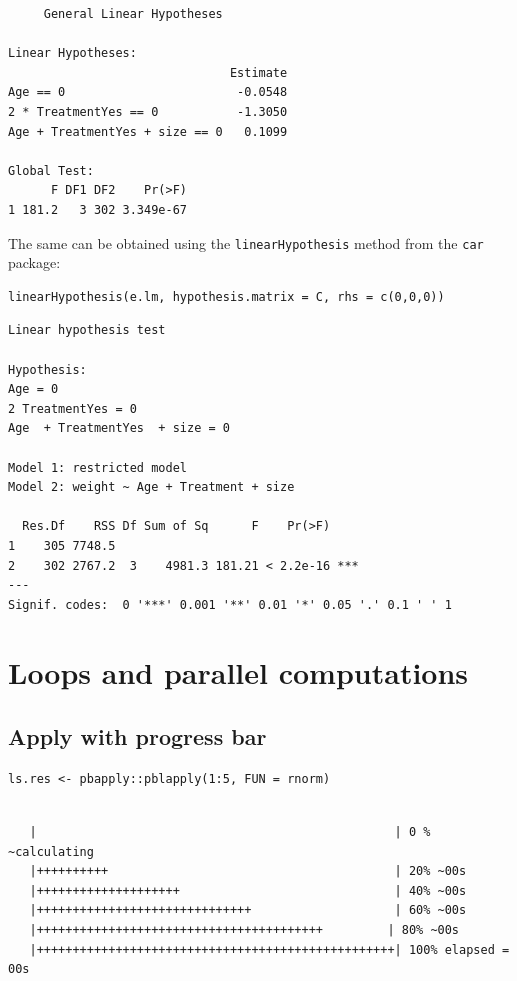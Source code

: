 \documentclass{article}
\begin{document}
\begin{verbatim}
	 General Linear Hypotheses

Linear Hypotheses:
                               Estimate
Age == 0                        -0.0548
2 * TreatmentYes == 0           -1.3050
Age + TreatmentYes + size == 0   0.1099

Global Test:
      F DF1 DF2    Pr(>F)
1 181.2   3 302 3.349e-67
\end{verbatim}

The same can be obtained using the \texttt{linearHypothesis} method from the \texttt{car} package:
\lstset{language=r,label= ,caption= ,captionpos=b,numbers=none}
\begin{lstlisting}
linearHypothesis(e.lm, hypothesis.matrix = C, rhs = c(0,0,0))
\end{lstlisting}

\begin{verbatim}
Linear hypothesis test

Hypothesis:
Age = 0
2 TreatmentYes = 0
Age  + TreatmentYes  + size = 0

Model 1: restricted model
Model 2: weight ~ Age + Treatment + size

  Res.Df    RSS Df Sum of Sq      F    Pr(>F)    
1    305 7748.5                                  
2    302 2767.2  3    4981.3 181.21 < 2.2e-16 ***
---
Signif. codes:  0 '***' 0.001 '**' 0.01 '*' 0.05 '.' 0.1 ' ' 1
\end{verbatim}

\section{Loops and parallel computations}
\label{sec:org2625cf2}
\subsection{Apply with progress bar}
\label{sec:org36fecaa}

\lstset{language=r,label= ,caption= ,captionpos=b,numbers=none}
\begin{lstlisting}
ls.res <- pbapply::pblapply(1:5, FUN = rnorm)
\end{lstlisting}

\begin{verbatim}

   |                                                  | 0 % ~calculating  
   |++++++++++                                        | 20% ~00s          
   |++++++++++++++++++++                              | 40% ~00s          
   |++++++++++++++++++++++++++++++                    | 60% ~00s          
   |++++++++++++++++++++++++++++++++++++++++         | 80% ~00s          
   |++++++++++++++++++++++++++++++++++++++++++++++++++| 100% elapsed = 00s
\end{verbatim}
\end{document}
